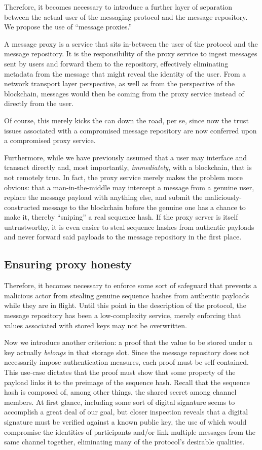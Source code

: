 Therefore, it becomes necessary to introduce a further layer of separation between the actual user of the messaging protocol and the message repository. We propose the use of ``message proxies.''

A message proxy is a service that sits in-between the user of the protocol and the message repository. It is the responsibility of the proxy service to ingest messages sent by users and forward them to the repository, effectively eliminating metadata from the message that might reveal the identity of the user. From a network transport layer perspective, as well as from the perspective of the blockchain, messages would then be coming from the proxy service instead of directly from the user.

Of course, this merely kicks the can down the road, per se, since now the trust issues associated with a compromised message repository are now conferred upon a compromised proxy service.

Furthermore, while we have previously assumed that a user may interface and transact directly and, most importantly, \emph{immediately}, with a blockchain, that is not remotely true. In fact, the proxy service merely makes the problem more obvious: that a man-in-the-middle may intercept a message from a genuine user, replace the message payload with anything else, and submit the maliciously-constructed message to the blockchain before the genuine one has a chance to make it, thereby ``sniping'' a real sequence hash. If the proxy server is itself untrustworthy, it is even easier to steal sequence hashes from authentic payloads and never forward said payloads to the message repository in the first place.

\subsection{Ensuring proxy honesty}\label{ensuring-proxy-honesty}

Therefore, it becomes necessary to enforce some sort of safeguard that prevents a malicious actor from stealing genuine sequence hashes from authentic payloads while they are in flight. Until this point in the description of the protocol, the message repository has been a low-complexity service, merely enforcing that values associated with stored keys may not be overwritten.

Now we introduce another criterion: a proof that the value to be stored under a key actually \emph{belongs} in that storage slot. Since the message repository does not necessarily impose authentication measures, each proof must be self-contained. This use-case dictates that the proof must show that some property of the payload links it to the preimage of the sequence hash. Recall that the sequence hash is composed of, among other things, the shared secret among channel members. At first glance, including some sort of digital signature seems to accomplish a great deal of our goal, but closer inspection reveals that a digital signature must be verified against a known public key, the use of which would compromise the identities of participants and/or link multiple messages from the same channel together, eliminating many of the protocol's desirable qualities.

